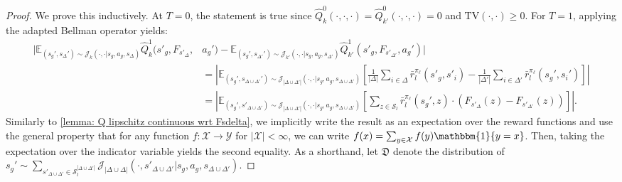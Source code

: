 \documentclass{article}
\theoremstyle{plain}
\theoremstyle{definition}
\def\E{\mathbb{E}}
\begin{document}
\begin{proof}
We prove this inductively. At $T=0$, the statement is true since $\hat{Q}_k^0(\cdot,\cdot,\cdot) = \hat{Q}_{k'}^0(\cdot,\cdot,\cdot) = 0$ and $\mathrm{TV}(\cdot,\cdot)\geq 0$. For $T=1$, applying the adapted Bellman operator yields: 
\begin{align*}
|\E_{(s_g',s_\Delta')\sim\mathcal{J}_k(\cdot,\cdot|s_g,a_g,s_\Delta)}\hat{Q}_k^1(s'_g,F_{s'_\Delta}, & a_g')- \E_{(s_g',s_{\Delta'}')\sim\mathcal{J}_{k'}(\cdot,\cdot|s_g,a_g,s_{\Delta'})}\hat{Q}_{k'}^1(s'_g, F_{s'_{\Delta'}}, a_g')| \\
&\!\!=\left| \E_{(s_g',s_{\Delta\cup\Delta'}')\sim\mathcal{J}_{|\Delta\cup\Delta'|}(\cdot,\cdot|s_g, a_g,s_{\Delta\cup\Delta'})}\left[\frac{1}{|\Delta|}\sum_{i\in\Delta}\bar{r}^{\pi_\ell}_l(s'_g,s'_i) - \frac{1}{|\Delta'|}\sum_{i\in\Delta'}\bar{r}^{\pi_\ell}_l(s_g',s_i')\right]\right| \\
&\!\!= \left|\E_{(s_g',s'_{\Delta\cup\Delta'})\sim\mathcal{J}_{|\Delta\cup\Delta'|}(\cdot,\cdot|s_g,a_g,s_{\Delta\cup\Delta'})}\left[\sum_{z\in\mathcal{S}_l}\bar{r}^{\pi_\ell}_l(s_g',z)\cdot (F_{s'_\Delta}(z) -  F_{s'_{\Delta'}}(z))\right]\right|.
\end{align*}
Similarly to \cref{lemma: Q lipschitz continuous wrt Fsdelta}, we implicitly write the result as an expectation over the reward functions and use the general property that for any function $f:\mathcal{X}\to\mathcal{Y}$ for $|\mathcal{X}|<\infty$, we can write $f(x) = \sum_{y\in\mathcal{X}}f(y)\mathbbm{1}\{y=x\}$. Then, taking the expectation over the indicator variable yields the second equality. As a shorthand, let $\mathfrak{D}$ denote the distribution of $s_{g}'\sim \sum_{s'_{\Delta\cup\Delta'}\in\mathcal{S}_l^{|\Delta\cup\Delta'|}}\mathcal{J}_{|\Delta\cup\Delta|}(\cdot,s'_{\Delta\cup\Delta'}|s_g,a_g,s_{\Delta\cup\Delta'})$. 


\end{proof}
\end{document}
